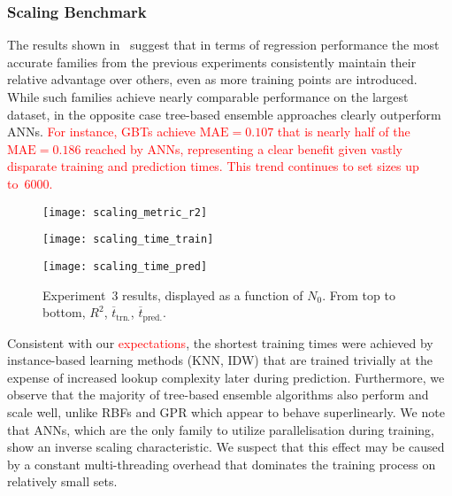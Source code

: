 \subsubsection{Scaling Benchmark}
\label{sec:res-exp3}

The results shown in~ suggest that in terms of regression
performance the most accurate families from the previous experiments
consistently maintain their relative advantage over others, even as
more training points are introduced. While such families achieve nearly comparable
performance on the largest dataset, in the opposite case tree-based ensemble
approaches clearly outperform ANNs. \textcolor{red}{For instance, GBTs achieve
$\text{MAE}=\num{0.107}$ that is nearly half of the $\text{MAE}=\num{0.186}$
reached by ANNs, representing a clear benefit given vastly disparate training
and prediction times. This trend continues to set sizes up to~\num{6000}.}

\begin{figure}
	\centering
	\hspace*{-0.1\columnwidth}
	\texttt{[image: scaling\_metric\_r2]}
	
	\vfill

	\hspace*{-0.1\columnwidth}
	\texttt{[image: scaling\_time\_train]}
	
	\vfill

	\hspace*{-0.1\columnwidth}
	\texttt{[image: scaling\_time\_pred]}
	\caption{Experiment~3 results, displayed as a function of $N_0$. From top to bottom, $R^2$,
	$\overline{t}_{\text{trn.}}$, $\overline{t}_{\text{pred.}}$.}
	\label{fig:scaling}
\end{figure}

Consistent with our \textcolor{red}{expectations}, the shortest training times were achieved by
instance-based learning methods (KNN, IDW) that
are trained trivially at the expense of increased lookup complexity later during prediction.
Furthermore, we observe that the majority of tree-based ensemble algorithms also perform
and scale well, unlike RBFs and GPR which appear to behave superlinearly. We note that ANNs,
which are the only family to utilize parallelisation during training, show an
inverse scaling characteristic. We suspect that this effect may be caused
by a constant multi-threading overhead that dominates the training process
on relatively small sets.

